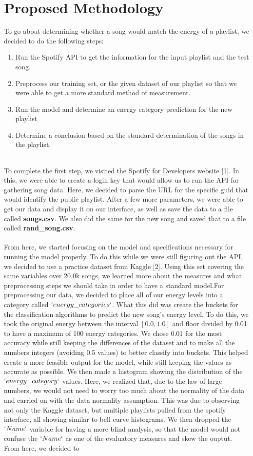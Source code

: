 \documentclass[titlepage]{article}
\begin{document}
\section{Proposed Methodology}
To go about determining whether a song would match the energy of a playlist, we decided to do the following steps:
\begin{enumerate}
    \item Run the Spotify API to get the information for the input playlist and the test song.
    \item Preprocess our training set, or the given dataset of our playlist so that we were able to get a more standard method of measurement.
    \item Run the model and determine an energy category prediction for the new playlist
    \item Determine a conclusion based on the standard determination of the songs in the playlist.
\end{enumerate} 
\\
To complete the first step, we visited the Spotify for Developers website [1]. In this, we were able to create a login key that would allow us to run the API for gathering song data. Here, we decided to parse the URL for the specific guid that would identify the public playlist. After a few more parameters, we were able to get our data and display it on our interface, as well as save the data to a file called \textbf{songs.csv}. We also did the same for the new song and saved that to a file called \textbf{rand\_song.csv}.
\\\\
From here, we started focusing on the model and specifications necessary for running the model properly. To do this while we were still figuring out the API, we decided to use a practice dataset from Kaggle [2]. Using this set covering the same variables over 20.0k songs, we learned more about the measures and what preprocessing steps we should take in order to have a standard model.For preprocessing our data, we decided to place all of our energy levels into a category called $`energy\_categories`$. What this did was create the buckets for the classification algorithms to predict the new song's energy level. To do this, we took the original energy between the interval  $[0.0, 1.0]$ and floor divided by 0.01 to have a maximum of 100 energy categories. We chose 0.01 for the most accuracy while still keeping the differences of the dataset and to make all the numbers integers (avoiding 0.5 values) to better classify into buckets. This helped create a more feasible output for the model, while still keeping the values as accurate as possible. We then made a histogram showing the distribution of the $`energy\_category`$ values. Here, we realized that, due to the law of large numbers, we would not need to worry too much about the normality of the data and carried on with the data normality assumption. This was due to observing not only the Kaggle dataset, but multiple playlists pulled from the spotify interface, all showing similar to bell curve histograms. We then dropped the $`Name`$ variable for having a more blind analysis, so that the model would not confuse the $`Name`$ as one of the evaluatory measures and skew the ouptut. From here, we decided to 
\end{document}
